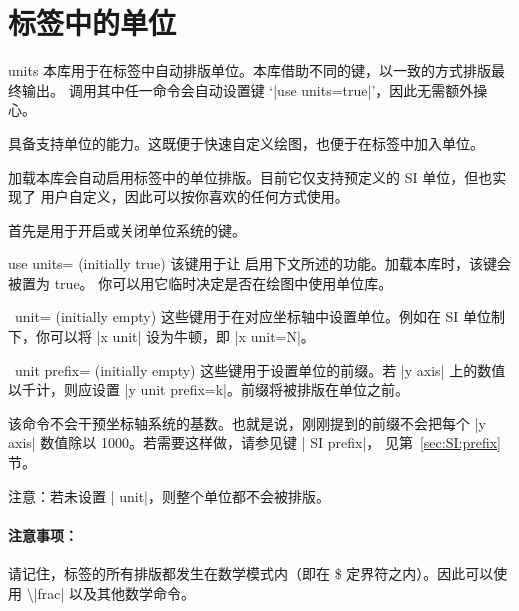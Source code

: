 
\section{标签中的单位}
\label{sec:units}

\begingroup
\def\pgfplotsmanualcurlibrary{units}

{}

\begin{pgfplotslibrary}{units}
    本库用于在标签中自动排版单位。本库借助不同的键，以一致的方式排版最终输出。
    调用其中任一命令会自动设置键 `|use units=true|'，因此无需额外操心。
\end{pgfplotslibrary}

\PGFPlots{} 具备支持单位的能力。这既便于快速自定义绘图，也便于在标签中加入单位。

加载本库会自动启用标签中的单位排版。目前它仅支持预定义的 SI 单位，但也实现了
用户自定义，因此可以按你喜欢的任何方式使用。

首先是用于开启或关闭单位系统的键。

\begin{pgfplotskey}{use units= (initially true)}
    该键用于让 \PGFPlots{} 启用下文所述的功能。加载本库时，该键会被置为 true。
    你可以用它临时决定是否在绘图中使用单位库。
\end{pgfplotskey}

\begin{pgfplotsxykey}{\x\ unit= (initially empty)}
    这些键用于在对应坐标轴中设置单位。例如在 SI 单位制下，你可以将
    |x unit| 设为牛顿，即 |x unit=N|。
\end{pgfplotsxykey}

\begin{pgfplotsxykey}{\x\ unit prefix= (initially empty)}
    这些键用于设置单位的前缀。若 |y axis| 上的数值以千计，则应设置
    |y unit prefix=k|。前缀将被排版在单位之前。

    该命令不会干预坐标轴系统的基数。也就是说，刚刚提到的前缀不会把每个
    |y axis| 数值除以 1000。若需要这样做，请参见键 | SI prefix|，
    见第~\ref{sec:SI:prefix} 节。

    注意：若未设置 | unit|，则整个单位都不会被排版。


    \paragraph{注意事项：}

    请记住，标签的所有排版都发生在数学模式内（即在 \$ 定界符之内）。因此可以使用
    \textbackslash|frac| 以及其他数学命令。
\end{pgfplotsxykey}

